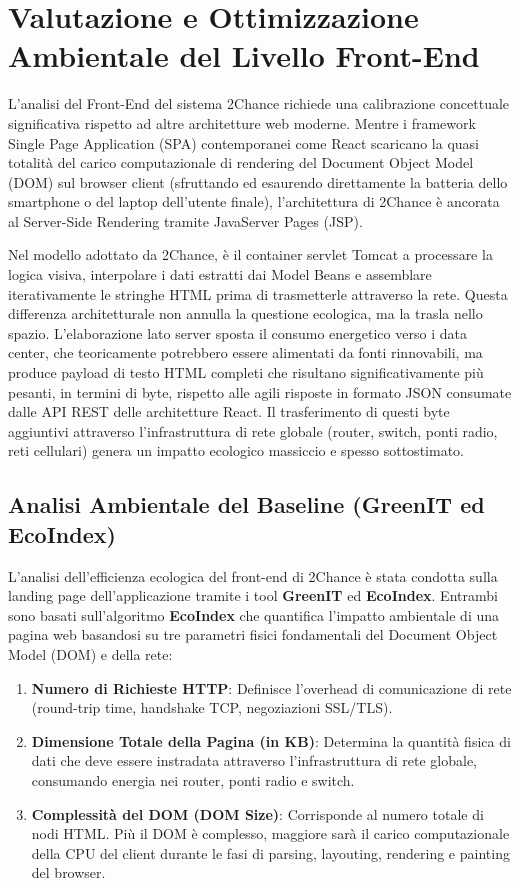 \chapter{Valutazione e Ottimizzazione Ambientale del Livello Front-End}

L'analisi del Front-End del sistema 2Chance richiede una calibrazione concettuale significativa rispetto ad altre architetture web moderne. Mentre i framework Single Page Application (SPA) contemporanei come React scaricano la quasi totalità del carico computazionale di rendering del Document Object Model (DOM) sul browser client (sfruttando ed esaurendo direttamente la batteria dello smartphone o del laptop dell'utente finale), l'architettura di 2Chance è ancorata al Server-Side Rendering tramite JavaServer Pages (JSP).

Nel modello adottato da 2Chance, è il container servlet Tomcat a processare la logica visiva, interpolare i dati estratti dai Model Beans e assemblare iterativamente le stringhe HTML prima di trasmetterle attraverso la rete. Questa differenza architetturale non annulla la questione ecologica, ma la trasla nello spazio. L'elaborazione lato server sposta il consumo energetico verso i data center, che teoricamente potrebbero essere alimentati da fonti rinnovabili, ma produce payload di testo HTML completi che risultano significativamente più pesanti, in termini di byte, rispetto alle agili risposte in formato JSON consumate dalle API REST delle architetture React. Il trasferimento di questi byte aggiuntivi attraverso l'infrastruttura di rete globale (router, switch, ponti radio, reti cellulari) genera un impatto ecologico massiccio e spesso sottostimato.

\section{Analisi Ambientale del Baseline (GreenIT ed EcoIndex)}

L'analisi dell'efficienza ecologica del front-end di 2Chance è stata condotta sulla landing page dell'applicazione tramite i tool \textbf{GreenIT} ed \textbf{EcoIndex}. Entrambi sono basati sull'algoritmo \textbf{EcoIndex} che quantifica l'impatto ambientale di una pagina web basandosi su tre parametri fisici fondamentali del Document Object Model (DOM) e della rete:
\begin{enumerate}
    \item \textbf{Numero di Richieste HTTP}: Definisce l'overhead di comunicazione di rete (round-trip time, handshake TCP, negoziazioni SSL/TLS).
    \item \textbf{Dimensione Totale della Pagina (in KB)}: Determina la quantità fisica di dati che deve essere instradata attraverso l'infrastruttura di rete globale, consumando energia nei router, ponti radio e switch.
    \item \textbf{Complessità del DOM (DOM Size)}: Corrisponde al numero totale di nodi HTML. Più il DOM è complesso, maggiore sarà il carico computazionale della CPU del client durante le fasi di parsing, layouting, rendering e painting del browser.
\end{enumerate}

